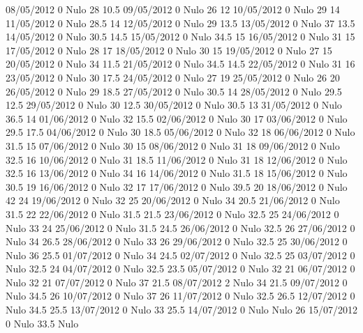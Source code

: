 08/05/2012  0     Nulo    28     10.5 
09/05/2012  0     Nulo    26     12 
10/05/2012  0     Nulo    29     14 
11/05/2012  0     Nulo    28.5   14 
12/05/2012  0     Nulo    29     13.5 
13/05/2012  0     Nulo    37     13.5 
14/05/2012  0     Nulo    30.5   14.5 
15/05/2012  0     Nulo    34.5   15 
16/05/2012  0     Nulo    31     15 
17/05/2012  0     Nulo    28     17 
18/05/2012  0     Nulo    30     15 
19/05/2012  0     Nulo    27     15 
20/05/2012  0     Nulo    34     11.5 
21/05/2012  0     Nulo    34.5   14.5 
22/05/2012  0     Nulo    31     16 
23/05/2012  0     Nulo    30     17.5 
24/05/2012  0     Nulo    27     19 
25/05/2012  0     Nulo    26     20 
26/05/2012  0     Nulo    29     18.5 
27/05/2012  0     Nulo    30.5   14 
28/05/2012  0     Nulo    29.5   12.5 
29/05/2012  0     Nulo    30     12.5 
30/05/2012  0     Nulo    30.5   13 
31/05/2012  0     Nulo    36.5   14 
01/06/2012  0     Nulo    32     15.5 
02/06/2012  0     Nulo    30     17 
03/06/2012  0     Nulo    29.5   17.5 
04/06/2012  0     Nulo    30     18.5 
05/06/2012  0     Nulo    32     18 
06/06/2012  0     Nulo    31.5   15 
07/06/2012  0     Nulo    30     15 
08/06/2012  0     Nulo    31     18 
09/06/2012  0     Nulo    32.5   16 
10/06/2012  0     Nulo    31     18.5 
11/06/2012  0     Nulo    31     18 
12/06/2012  0     Nulo    32.5   16 
13/06/2012  0     Nulo    34     16 
14/06/2012  0     Nulo    31.5   18 
15/06/2012  0     Nulo    30.5   19 
16/06/2012  0     Nulo    32     17 
17/06/2012  0     Nulo    39.5   20 
18/06/2012  0     Nulo    42     24 
19/06/2012  0     Nulo    32     25 
20/06/2012  0     Nulo    34     20.5 
21/06/2012  0     Nulo    31.5   22 
22/06/2012  0     Nulo    31.5   21.5 
23/06/2012  0     Nulo    32.5   25 
24/06/2012  0     Nulo    33     24 
25/06/2012  0     Nulo    31.5   24.5 
26/06/2012  0     Nulo    32.5   26 
27/06/2012  0     Nulo    34     26.5 
28/06/2012  0     Nulo    33     26 
29/06/2012  0     Nulo    32.5   25 
30/06/2012  0     Nulo    36     25.5 
01/07/2012  0     Nulo    34     24.5 
02/07/2012  0     Nulo    32.5   25 
03/07/2012  0     Nulo    32.5   24 
04/07/2012  0     Nulo    32.5   23.5 
05/07/2012  0     Nulo    32     21 
06/07/2012  0     Nulo    32     21 
07/07/2012  0     Nulo    37     21.5 
08/07/2012  2     Nulo    34     21.5 
09/07/2012  0     Nulo    34.5   26 
10/07/2012  0     Nulo    37     26 
11/07/2012  0     Nulo    32.5   26.5 
12/07/2012  0     Nulo    34.5   25.5 
13/07/2012  0     Nulo    33     25.5 
14/07/2012  0     Nulo   Nulo    26 
15/07/2012  0     Nulo    33.5  Nulo
